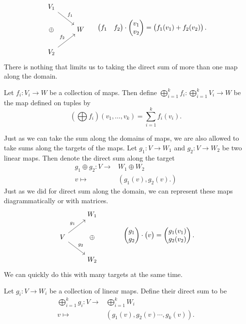 \[
\begin{tikzcd}
V_1\arrow{dr}{f_1}\\
\oplus & W\\
V_2 \arrow{ur}{f_2}
\end{tikzcd}
\;\;\;\;\;\begin{pmatrix} f_1 & f_2 \end{pmatrix} \cdot \begin{pmatrix} v_1\\v_2\end{pmatrix} = \begin{pmatrix}f_1(v_1)+f_2(v_2) \end{pmatrix}.
\]
There is nothing that limits us to taking the direct sum of more than one map along the domain. 
\begin{definition}
Let $f_i: V_i\to W$ be a collection of maps. Then define $\bigoplus_{i=1}^k f_i: \bigoplus_{i=1}^k V_i\to W$ be the map defined on tuples by
\[\left(\bigoplus f_i\right)(v_1, \ldots, v_{k})=\sum_{i=1}^k f_i(v_i).\]
\end{definition}
Just as we can take the sum along the domains of maps, we are also allowed to take sums along the targets of the maps. 
Let $g_1: V\to W_1$ and $g_2: V\to W_2$ be two linear maps. Then denote the direct sum along the target
\begin{align*}
g_1\oplus g_2: V\to & W_1\oplus W_2\\
v\mapsto& (g_1(v), g_2(v).)
\end{align*}
Just as we did for direct sum along the domain, we can represent these maps diagrammatically or with matrices. 
\[\begin{tikzcd}
\;& W_1\\
V\arrow{ur}{g_1}   \arrow{dr}{g_2} & \oplus \\
\; & W_2 
\end{tikzcd}\;\;\;\;\;\;\;\;\;\;\;\;\begin{pmatrix} g_1 \\ g_2 \end{pmatrix} \cdot \begin{pmatrix} v\end{pmatrix} = \begin{pmatrix}g_1(v_1)\\g_2(v_2) \end{pmatrix}.\]
We can quickly do this with many targets at the same time.
\begin{definition}
Let $g_i: V\to W_i$ be a collection of linear maps. Define their direct sum to be 
\begin{align*}
\bigoplus_{i=1}^k g_i: V\to& \bigoplus_{i=1}^k W_i\\
v\mapsto& (g_1(v), g_2(v) \cdots , g_k(v)).
\end{align*}
\end{definition}
